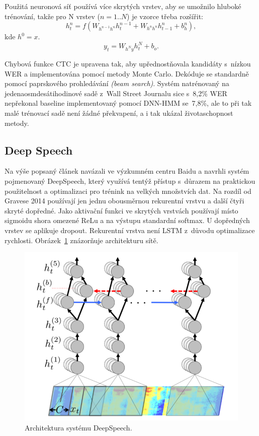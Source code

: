 Použitá neuronová síť používá více skrytých vrstev, aby se umožnilo hluboké
trénování, takže pro N vrstev ($n = 1 .. N$) je vzorce třeba rozšířit:
\begin{equation}
h_t^n = f(W_{h^{n-1}h^n}h_t^{n-1} + W_{h^{n}h^{n}}h_{t-1}^n + b_h^n),
\end{equation}
kde $h^0 = x$.
\begin{equation}
y_t = W_{h^{N}y}h_t^N + b_o.
\end{equation}

Chybová funkce CTC je upravena tak, aby upřednostňovala kandidáty s~nízkou WER a
implementována pomocí metody Monte Carlo. Dekóduje se standardně pomocí
paprskového prohledávání \textit{(beam search)}. Systém natrénovaný na
jedenaosmdesátihodinové sadě z~Wall Street Journalu sice s~8,2\% WER nepřekonal
baseline implementovaný pomocí DNN-HMM se~7,8\%, ale to při tak malé trénovací
sadě není žádné překvapení, a i tak ukázal životaschopnost metody.

\subsection{Deep Speech}
\label{ssec:deepspeechpaper}

Na výše popsaný článek navázali ve výzkumném centru Baidu a navrhli systém
pojmenovaný DeepSpeech\cite{hannun2014deep}, který využívá tentýž přístup
s~důrazem na praktickou použitelnost a optimalizaci pro trénink na velkých
množstvích dat. Na rozdíl od Gravese 2014 používají jen jednu obousměrnou
rekurentní vrstvu a další čtyři skryté dopředné. Jako aktivační funkci ve
skrytých vrstvách používají místo sigmoidu shora omezené ReLu a na výstupu
standardní softmax. U dopředných vrstev se aplikuje dropout. Rekurentní vrstva
není LSTM z~důvodu optimalizace rychlosti. Obrázek~\ref{fig:deepspeech-arch}
znázorňuje architekturu sítě.

\begin{figure}[htpb]
\includegraphics[scale=0.58]{rc/deepspeech-arch.png}
\caption{
    Architektura systému DeepSpeech.
}
\label{fig:deepspeech-arch}
\end{figure}

